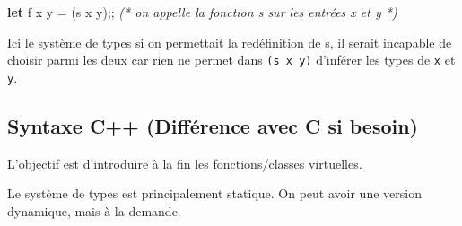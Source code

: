 \documentclass[]{article}
\newenvironment{Shaded}{}{}
\newcommand{\KeywordTok}[1]{\textcolor[rgb]{0.00,0.44,0.13}{\textbf{#1}}}
\newcommand{\CommentTok}[1]{\textcolor[rgb]{0.38,0.63,0.69}{\textit{#1}}}
\newcommand{\NormalTok}[1]{#1}
\begin{document}
\begin{Shaded}
\begin{Highlighting}[]
\KeywordTok{let}\NormalTok{ f x y = (s x y);; }\CommentTok{(* on appelle la fonction s sur les entrées x et y *)}
\end{Highlighting}
\end{Shaded}

Ici le système de types si on permettait la redéfinition de s, il serait
incapable de choisir parmi les deux car rien ne permet dans
\texttt{(s\ x\ y)} d'inférer les types de \texttt{x} et \texttt{y}.

\subsection{Syntaxe C++ (Différence avec C si
besoin)}\label{syntaxe-c-diffuxe9rence-avec-c-si-besoin}

L'objectif est d'introduire à la fin les fonctions/classes virtuelles.

Le système de types est principalement statique. On peut avoir une
version dynamique, mais à la demande.
\end{document}

